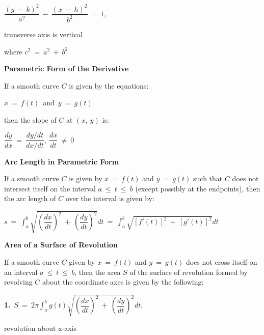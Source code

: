 \documentclass{article}
\begin{document}
\begin{large}
\hspace{1.0in} $\dfrac{(y\ -\ k)^{2}}{a^{2}}\ -\ \dfrac{(x\ -\ h)^{2}}{b^{2}}\ =\ 1$, \begin{Large} transverse axis is vertical \end{Large}

\hspace{0.1in} where $c^{2}\ =\ a^{2}\ +\ b^{2}$

\textbf{Parametric Form of the Derivative}

\hspace{0.1in} If a smooth curve $C$ is given by the equations:

\hspace{1.0in} $x\ =\ f(t)$\ and\ $y\ =\ g(t)$

\hspace{0.1in} then the slope of $C$ at $(x,\ y)$ is:

\hspace{0.5in} $\dfrac{dy}{dx}\ =\ \dfrac{dy/dt}{dx/dt},\ \dfrac{dx}{dt}\ \neq\ 0$

\vspace{1.8in}
\textbf{Arc Length in Parametric Form}

\hspace{0.1in} If a smooth curve $C$ is given by $x\ =\ f(t)$ and $y\ =\ g(t)$ such that $C$ does not intersect itself on the interval $a\ \leq\ t\ \leq\ b$ (except possibly at the endpoints), then the arc length of $C$ over the interval is given by:

\hspace{1.0in} $s\ =\ \displaystyle\int^{b}_{a}\sqrt{\left(\dfrac{dx}{dt}\right)^{2}\ +\ \left(\dfrac{dy}{dt}\right)^{2}}dt\ =\ \displaystyle\int^{b}_{a}\sqrt{[f'(t)]^{2}\ +\ [g'(t)]^{2}}dt$

\textbf{Area of a Surface of Revolution}

\hspace{0.1in} If a smooth curve $C$ given by $x\ =\ f(t)$ and $y\ =\ g(t)$ does not cross itself on an interval $a\ \leq\ t\ \leq\ b$, then the area $S$ of the surface of revolution formed by revolving $C$ about the coordinate axes is given by the following:

\hspace{0.2in} \textbf{1.}\ $S\ =\ 2\pi\displaystyle\int^{b}_{a}g(t)\sqrt{\left(\dfrac{dx}{dt}\right)^{2}\ +\ \left(\dfrac{dy}{dt}\right)^{2}}dt$, \begin{Large} revolution about x-axis \end{Large}


\end{large}
\end{document}
